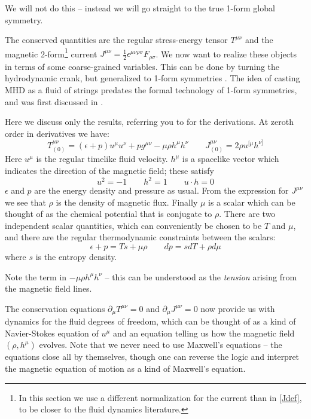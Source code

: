 \documentclass[aps,preprint,nofootinbib,preprintnumbers,eqsecnum,superscriptaddress]{revtex4}
\newcommand{\be}{\begin{equation}}
\newcommand{\ee}{\end{equation}}
\def\ep{{\epsilon}}
\newcommand{\p}{\partial}
\newcommand\sig{\sigma}
\numberwithin{equation}{section}
\begin{document}
We will not do this -- instead we will go straight to the true 1-form global symmetry. 

The conserved quantities are the regular stress-energy tensor $T^{\mu\nu}$ and the magnetic 2-form\footnote{In this section we use a different normalization for the current than in \eqref{Jdef}, to be closer to the fluid dynamics literature.} current $J^{\mu\nu} = \frac{1}{2} \ep^{\mu\nu\rho\sig}F_{\rho\sig}$. We now want to realize these objects in terms of some coarse-grained variables. This can be done by turning the hydrodynamic crank, but generalized to 1-form symmetries \cite{Grozdanov:2016tdf}. The idea of casting MHD as a fluid of strings predates the formal technology of 1-form symmetries, and was first discussed in \cite{Schubring:2014iwa}. 

Here we discuss only the results, referring you to \cite{Grozdanov:2016tdf} for the derivations. At zeroth order in derivatives we have:
\be
T^{\mu\nu}_{(0)} = (\ep + p)u^{\mu} u^{\nu} + p g^{\mu\nu} - \mu \rho h^{\mu} h^{\nu} \qquad J^{\mu\nu}_{(0)} = 2 \rho u^{[\mu} h^{\nu]} \label{MHD0thorder} 
\ee
Here $u^{\mu}$ is the regular timelike fluid velocity. $h^{\mu}$ is a spacelike vector which indicates the direction of the magnetic field; these satisfy
\be
u^2 = -1 \qquad h^2 = 1 \qquad u \cdot h = 0
\ee
$\ep$ and $p$ are the energy density and pressure as usual. From the expression for $J^{\mu\nu}$ we see that $\rho$ is the density of magnetic flux. Finally $\mu$ is a scalar which can be thought of as the chemical potential that is conjugate to $\rho$. There are two independent scalar quantities, which can conveniently be chosen to be $T$ and $\mu$, and there are the regular thermodynamic constraints between the scalars:
\be
\ep + p = Ts + \mu \rho \qquad dp = s dT + \rho d\mu
\ee
where $s$ is the entropy density.  

Note the term in $-\mu\rho h^{\mu} h^{\nu}$ -- this can be understood as the {\it tension} arising from the magnetic field lines. 

The conservation equations $\p_{\mu}T^{\mu\nu} = 0$ and $\p_{\mu} J^{\mu\nu} = 0$ now provide us with dynamics for the fluid degrees of freedom, which can be thought of as a kind of Navier-Stokes equation of $u^{\mu}$ and an equation telling us how the magnetic field $(\rho, h^{\mu})$ evolves. Note that we never need to use Maxwell's equations -- the equations close all by themselves, though one can reverse the logic and interpret the magnetic equation of motion as a kind of Maxwell's equation. 
\end{document}
